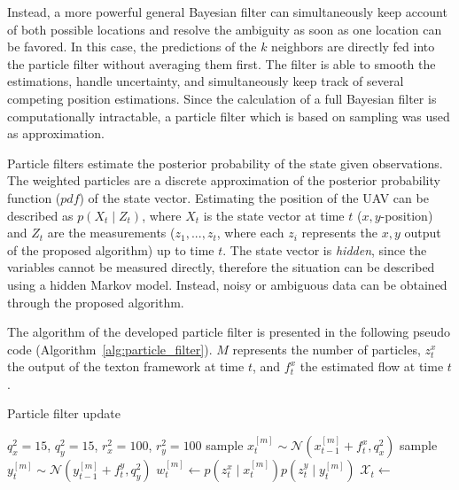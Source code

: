 \documentclass{report}
\begin{document}
Instead, a more powerful general Bayesian filter can simultaneously
keep account of both possible locations and resolve the ambiguity as
soon as one location can be favored. In this case, the predictions of
the $k$ neighbors are directly fed into the particle filter without
averaging them first. The filter is able to smooth the estimations,
handle uncertainty, and simultaneously keep track of several competing
position estimations. Since the calculation of a full Bayesian filter
is computationally intractable, a particle filter which is based on
sampling was used as approximation.

Particle filters estimate the posterior probability of the state given
observations. The weighted particles are a discrete approximation of
the posterior probability function ($pdf$) of the state vector.
Estimating the position of the UAV can be described as
$p(X_t \mid Z_t)$, where $X_t$ is the state vector at time $t$
($x,y$-position) and $Z_t$ are the measurements ($z_1, ..., z_t$,
where each $z_i$ represents the $x,y$ output of the proposed
algorithm) up to time $t$. The state vector is \emph{hidden}, since
the variables cannot be measured directly, therefore the situation can
be described using a hidden Markov model. Instead, noisy or ambiguous
data can be obtained through the proposed algorithm.

The algorithm of the developed particle filter is presented in the
following pseudo code (Algorithm~\ref{alg:particle_filter}). $M$
represents the number of particles, $z_t^x$ the output of the texton
framework at time $t$, and $f_t^x$ the estimated flow at time $t$.
\begin{algorithm}
\caption{Particle filter update}
\label{alg:particle_filter}
\begin{algorithmic}[1]
  \State $q_x^2 = 15$, $q_y^2 = 15$, $r_x^2 = 100$, $r_y^2 = 100$
  \State sample $x_t^{[m]} \sim \mathcal{N}(x_{t-1}^{[m]} + f_t^x, q_x^2)$
  \State sample $y_t^{[m]} \sim \mathcal{N}(y_{t-1}^{[m]} + f_t^y, q_y^2)$
  \State $w_t^{[m]} \gets p(z_t^x \mid x_t^{[m]}) p(z_t^y \mid y_t^{[m]})$
  \EndFor
  \State $\mathcal{X}_t \gets$ 
  \EndProcedure
\end{algorithmic}
\end{algorithm}
\end{document}

